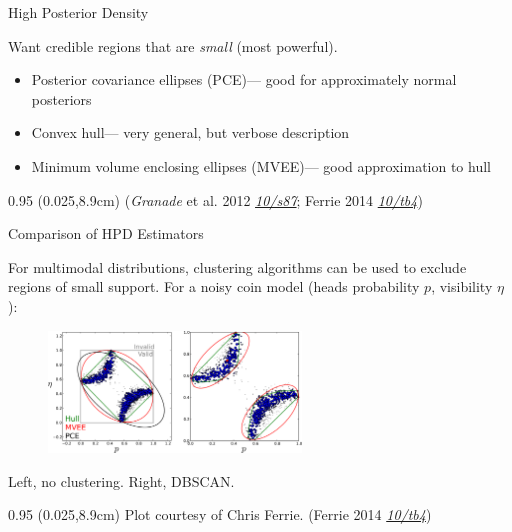 \documentclass[xcolor=dvipsnames, compress]{beamer}
\renewcommand\UrlFont{\color{red}\rmfamily\itshape}
\newcommand{\shortdoi}[1]{\href{http://doi.org/#1}{\UrlFont 10/#1}}
\newcommand{\bottomnote}[1]{
  \begin{textblock*}{0.95\paperwidth} (0.025\paperwidth,8.9cm)
    {\tiny \hfill #1}
  \end{textblock*}
}
\begin{document}
\begin{frame}{High Posterior Density}

  Want credible regions that are \emph{small} (most powerful).

  \begin{itemize}
    \item Posterior covariance ellipses (PCE)--- good for approximately normal posteriors
    \item Convex hull--- very general, but verbose description
    \item Minimum volume enclosing ellipses (MVEE)--- good approximation to hull
  \end{itemize}

  \bottomnote{(\emph{Granade} et al. 2012 \shortdoi{s87}; Ferrie 2014 \shortdoi{tb4})}

\end{frame}

\begin{frame}{Comparison of HPD Estimators}

  For multimodal distributions, clustering algorithms can be used
  to exclude regions of small support.
  For a noisy coin model (heads probability $p$, visibility $\eta$):

  \begin{figure}
    \includegraphics[width=0.6\textwidth]{hpd-clusters}
  \end{figure}

  Left, no clustering. Right, DBSCAN.

  \bottomnote{Plot courtesy of Chris Ferrie. (Ferrie 2014 \shortdoi{tb4})}

\end{frame}
\end{document}
